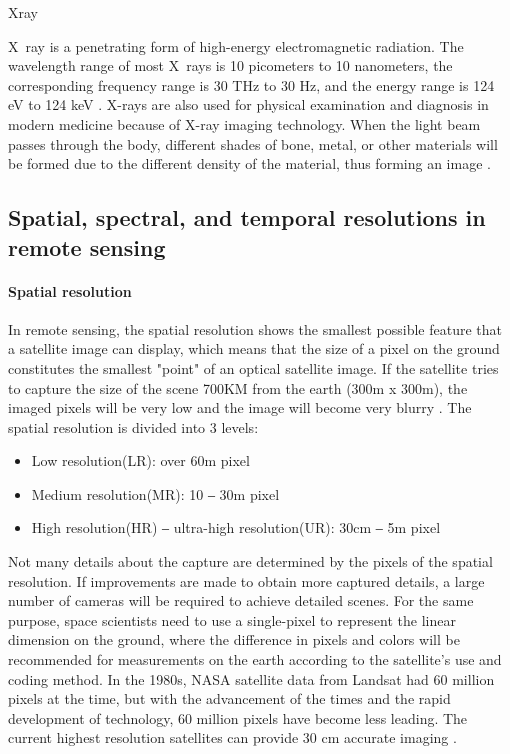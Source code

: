 \documentclass[conference]{IEEEtran}
\newcommand{\subparagraph}{}
\begin{document}
\subparagraph{X\-ray}
    
X\ ray is a penetrating form of high-energy electromagnetic radiation. The wavelength range of most X\ rays is 10 picometers to 10 nanometers, the corresponding frequency range is 30 THz to 30 Hz, and the energy range is 124 eV to 124 keV \cite{XrayWiki61:online}. X-rays are also used for physical examination and diagnosis in modern medicine because of X-ray imaging technology. When the light beam passes through the body, different shades of bone, metal, or other materials will be formed due to the different density of the material, thus forming an image \cite{XrayImag8:online}.

\subsection{Spatial, spectral, and temporal resolutions in remote sensing}
    
\paragraph{Spatial resolution} 
    
In remote sensing, the spatial resolution shows the smallest possible feature that a satellite image can display, which means 
that the size of a pixel on the ground constitutes the smallest "point" of an optical satellite image. If the satellite tries 
to capture the size of the scene 700KM from the earth (300m x 300m), the imaged pixels will be very low and the image will become 
very blurry \cite{AtlasAIW26:online}. The spatial resolution is divided into 3 levels:
    
    \begin{itemize}
        \item Low resolution(LR): over 60m pixel 
        \item Medium resolution(MR): 10 ‒ 30m pixel 
        \item High resolution(HR) ‒ ultra-high resolution(UR): 30cm ‒ 5m pixel
    \end{itemize}
    
Not many details about the capture are determined by the pixels of the spatial resolution. If improvements are made to obtain 
more captured details, a large number of cameras will be required to achieve detailed scenes. For the same purpose, space scientists 
need to use a single-pixel to represent the linear dimension on the ground, where the difference in pixels and colors will be 
recommended for measurements on the earth according to the satellite's use and coding method. In the 1980s, NASA satellite data from 
Landsat had 60 million pixels at the time, but with the advancement of the times and the rapid development of technology, 60 million 
pixels have become less leading. The current highest resolution satellites can provide 30 cm accurate imaging \cite{Satellit48:online}. 
\end{document}
